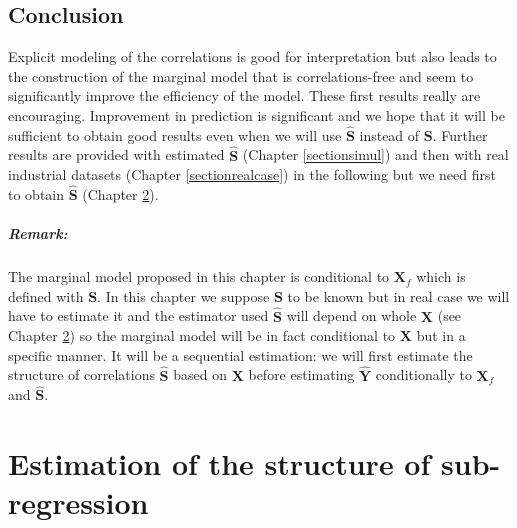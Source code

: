 \documentclass[12pt,a4paper]{report}
\begin{document}


				
		\section{Conclusion} Explicit modeling of the correlations is good for interpretation but also leads to the construction of the marginal model that is correlations-free and seem to significantly improve the efficiency of the model. These first results really are encouraging. Improvement in prediction is significant and we hope that it will be sufficient to obtain good results even when we will use $\hat{\boldsymbol{S}}$ instead of $\boldsymbol{S}$. Further results are provided  with estimated $\hat{\boldsymbol{S}}$ (Chapter \ref{sectionsimul}) and then with real industrial datasets (Chapter \ref{sectionrealcase}) in the following but we need first to obtain $\hat{\boldsymbol{S}}$ (Chapter  \ref{chapterMCMC}).

\paragraph{Remark:} The marginal model proposed in this chapter is conditional to $\boldsymbol{X}_f$ which is defined with $\boldsymbol{S}$. In this chapter we suppose $\boldsymbol{S}$ to be known but in real case we will have to estimate it and the estimator used $\hat{\boldsymbol{S}}$ will depend on whole $\boldsymbol{X}$ (see Chapter \ref{chapterMCMC}) so the marginal model will be in fact conditional to $\boldsymbol{X}$ but in a specific manner. It will be a sequential estimation: we will first estimate the structure of correlations $\hat{\boldsymbol{S}}$ based on $\boldsymbol{X}$ before estimating $\hat{\boldsymbol{Y}}$ conditionally to $\boldsymbol{X}_f$ and $\hat{\boldsymbol{S}}$.		


\chapter{Estimation of the structure of sub-regression}\label{chapterMCMC}
\end{document}
